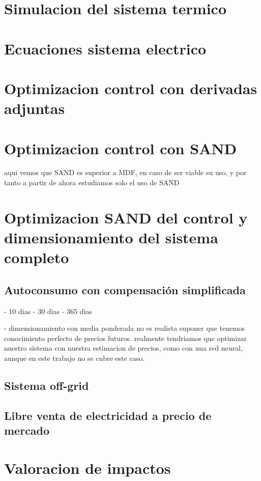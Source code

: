 \section{Simulacion del sistema termico}

\section{Ecuaciones sistema electrico}

\section{Optimizacion control con derivadas adjuntas}

\section{Optimizacion control con SAND}

aqui vemos que SAND es superior a MDF, en caso de ser viable su uso,
y por tanto a partir de ahora estudiamos solo el uso de SAND

\section{Optimizacion SAND del control y dimensionamiento del sistema completo}
\subsection{Autoconsumo con compensación simplificada}
- 10 dias
- 30 dias
- 365 dias

- dimensionamiento con media ponderada
no es realista suponer que tenemos conocimiento perfecto de precios futuros.
realmente tendriamos que optimizar nuestro sistema con nuestra estimacion
de precios, como con una red neural, aunque en este trabajo no se cubre este caso.
\subsection{Sistema off-grid}
\subsection{Libre venta de electricidad a precio de mercado}

\section{Valoracion de impactos}
